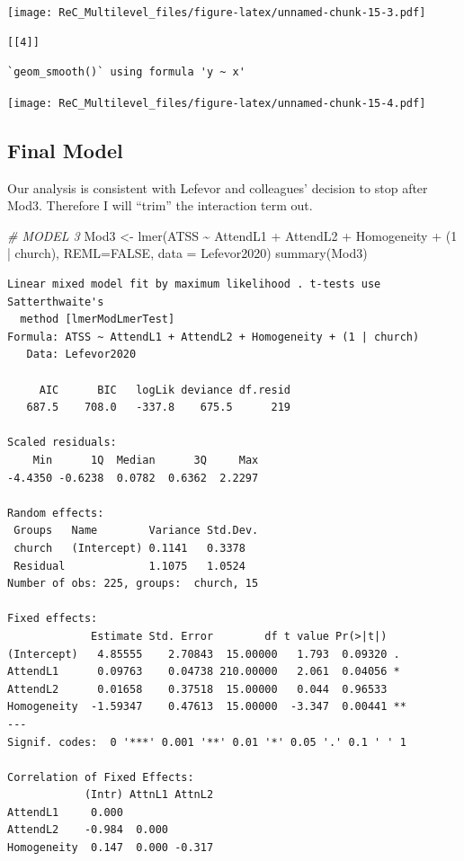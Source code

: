 \documentclass[
  11pt,
]{book}
\newenvironment{Shaded}{\begin{snugshade}}{\end{snugshade}}
\newcommand{\AttributeTok}[1]{\textcolor[rgb]{0.77,0.63,0.00}{#1}}
\newcommand{\CommentTok}[1]{\textcolor[rgb]{0.56,0.35,0.01}{\textit{#1}}}
\newcommand{\ConstantTok}[1]{\textcolor[rgb]{0.00,0.00,0.00}{#1}}
\newcommand{\DecValTok}[1]{\textcolor[rgb]{0.00,0.00,0.81}{#1}}
\newcommand{\FunctionTok}[1]{\textcolor[rgb]{0.00,0.00,0.00}{#1}}
\newcommand{\NormalTok}[1]{#1}
\newcommand{\OtherTok}[1]{\textcolor[rgb]{0.56,0.35,0.01}{#1}}
\newcommand{\SpecialCharTok}[1]{\textcolor[rgb]{0.00,0.00,0.00}{#1}}
\begin{document}
\texttt{[image: ReC\_Multilevel\_files/figure-latex/unnamed-chunk-15-3.pdf]}

\begin{verbatim}
[[4]]
\end{verbatim}

\begin{verbatim}
`geom_smooth()` using formula 'y ~ x'
\end{verbatim}

\texttt{[image: ReC\_Multilevel\_files/figure-latex/unnamed-chunk-15-4.pdf]}

\hypertarget{final-model}{%
\subsection{Final Model}\label{final-model}}

Our analysis is consistent with Lefevor and colleagues' decision to stop after Mod3. Therefore I will ``trim'' the interaction term out.

\begin{Shaded}
\begin{Highlighting}[]
\CommentTok{\# MODEL 3}
\NormalTok{Mod3 }\OtherTok{\textless{}{-}} \FunctionTok{lmer}\NormalTok{(ATSS }\SpecialCharTok{\textasciitilde{}}\NormalTok{ AttendL1 }\SpecialCharTok{+}\NormalTok{ AttendL2 }\SpecialCharTok{+}\NormalTok{ Homogeneity }\SpecialCharTok{+}\NormalTok{ (}\DecValTok{1} \SpecialCharTok{|}\NormalTok{ church), }\AttributeTok{REML=}\ConstantTok{FALSE}\NormalTok{, }\AttributeTok{data =}\NormalTok{ Lefevor2020)}
\FunctionTok{summary}\NormalTok{(Mod3)}
\end{Highlighting}
\end{Shaded}

\begin{verbatim}
Linear mixed model fit by maximum likelihood . t-tests use Satterthwaite's
  method [lmerModLmerTest]
Formula: ATSS ~ AttendL1 + AttendL2 + Homogeneity + (1 | church)
   Data: Lefevor2020

     AIC      BIC   logLik deviance df.resid 
   687.5    708.0   -337.8    675.5      219 

Scaled residuals: 
    Min      1Q  Median      3Q     Max 
-4.4350 -0.6238  0.0782  0.6362  2.2297 

Random effects:
 Groups   Name        Variance Std.Dev.
 church   (Intercept) 0.1141   0.3378  
 Residual             1.1075   1.0524  
Number of obs: 225, groups:  church, 15

Fixed effects:
             Estimate Std. Error        df t value Pr(>|t|)   
(Intercept)   4.85555    2.70843  15.00000   1.793  0.09320 . 
AttendL1      0.09763    0.04738 210.00000   2.061  0.04056 * 
AttendL2      0.01658    0.37518  15.00000   0.044  0.96533   
Homogeneity  -1.59347    0.47613  15.00000  -3.347  0.00441 **
---
Signif. codes:  0 '***' 0.001 '**' 0.01 '*' 0.05 '.' 0.1 ' ' 1

Correlation of Fixed Effects:
            (Intr) AttnL1 AttnL2
AttendL1     0.000              
AttendL2    -0.984  0.000       
Homogeneity  0.147  0.000 -0.317
\end{verbatim}
\end{document}
